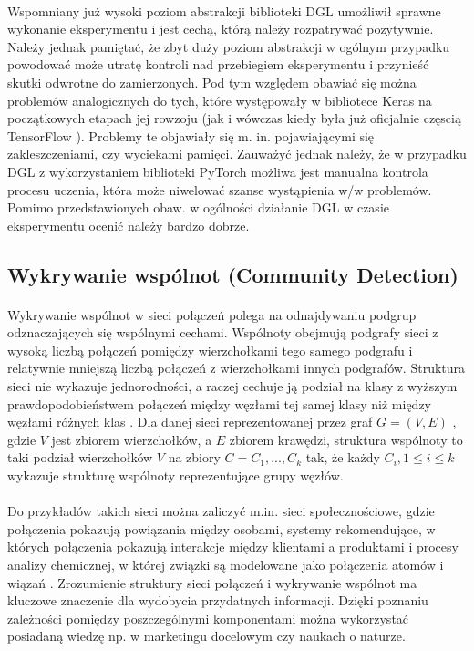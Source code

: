 \documentclass{article}
\begin{document}
\paragraph{}
Wspomniany już wysoki poziom abstrakcji biblioteki DGL \cite{dgl} umożliwił sprawne wykonanie eksperymentu i jest cechą, którą należy rozpatrywać pozytywnie. Należy jednak pamiętać, że zbyt duży poziom abstrakcji w ogólnym przypadku powodować może utratę kontroli nad przebiegiem eksperymentu i przynieść skutki odwrotne do zamierzonych. Pod tym względem obawiać się można problemów analogicznych do tych, które występowały w bibliotece Keras \cite{keras} na początkowych etapach jej rowzoju (jak i wówczas kiedy była już oficjalnie częscią TensorFlow \cite{tf}). Problemy te objawiały się m. in. pojawiającymi się zakleszczeniami, czy wyciekami pamięci. Zauważyć jednak należy, że w przypadku DGL \cite{dgl} z wykorzystaniem biblioteki PyTorch \cite{torch} możliwa jest manualna kontrola procesu uczenia, która może niwelować szanse wystąpienia w/w problemów. Pomimo przedstawionych obaw. w ogólności działanie DGL \cite{dgl} w czasie eksperymentu ocenić należy bardzo dobrze.


\subsection{Wykrywanie wspólnot (Community Detection)}
\paragraph{}
Wykrywanie wspólnot w sieci połączeń polega na odnajdywaniu podgrup odznaczających się wspólnymi cechami. Wspólnoty obejmują podgrafy sieci z wysoką liczbą połączeń pomiędzy wierzchołkami tego samego podgrafu i relatywnie mniejszą liczbą połączeń z wierzchołkami innych podgrafów. Struktura sieci nie wykazuje jednorodności, a raczej cechuje ją podział na klasy z wyższym prawdopodobieństwem połączeń między węzłami tej samej klasy niż między węzłami różnych klas \cite{community_detection}. Dla danej sieci reprezentowanej przez graf \(G = (V, E)\) , gdzie \(V\) jest zbiorem wierzchołków, a \(E\) zbiorem krawędzi, struktura wspólnoty to taki podział wierzchołków \(V\) na zbiory \(C = C_{1},..., C_{k}\) tak, że każdy \(C_{i}, 1 \leq i \leq	 k\) wykazuje strukturę wspólnoty reprezentujące grupy węzłów.

\paragraph{}
Do przykładów takich sieci można zaliczyć m.in. sieci społecznościowe, gdzie połączenia pokazują powiązania między osobami, systemy rekomendujące, w których połączenia pokazują interakcje między klientami a produktami i procesy analizy chemicznej, w której związki są modelowane jako połączenia atomów i wiązań \cite{network_community_detection}. Zrozumienie struktury sieci połączeń i wykrywanie wspólnot ma kluczowe znaczenie dla wydobycia przydatnych informacji. Dzięki poznaniu zależności pomiędzy poszczególnymi komponentami można wykorzystać posiadaną wiedzę np. w marketingu docelowym czy naukach o naturze. 
\end{document}
